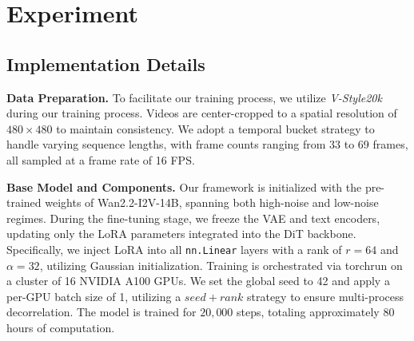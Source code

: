 \documentclass[runningheads]{llncs}
\begin{document}
\section{Experiment}
\subsection{Implementation Details}

\textbf{Data Preparation.} 
To facilitate our training process, we utilize \textit{V-Style20k} during our training process. Videos are center-cropped to a spatial resolution of $480 \times 480$ to maintain consistency. We adopt a temporal bucket strategy to handle varying sequence lengths, with frame counts ranging from 33 to 69 frames, all sampled at a frame rate of 16 FPS.

\textbf{Base Model and Components.} 
Our framework is initialized with the pre-trained weights of Wan2.2-I2V-14B, spanning both high-noise and low-noise regimes. During the fine-tuning stage, we freeze the VAE and text encoders, updating only the LoRA parameters integrated into the DiT backbone. Specifically, we inject LoRA into all \texttt{nn.Linear} layers with a rank of $r=64$ and $\alpha=32$, utilizing Gaussian initialization. Training is orchestrated via torchrun on a cluster of 16 NVIDIA A100 GPUs. We set the global seed to 42 and apply a per-GPU batch size of 1, utilizing a $seed+rank$ strategy to ensure multi-process decorrelation. The model is trained for $20,000$ steps, totaling approximately 80 hours of computation.
\end{document}
